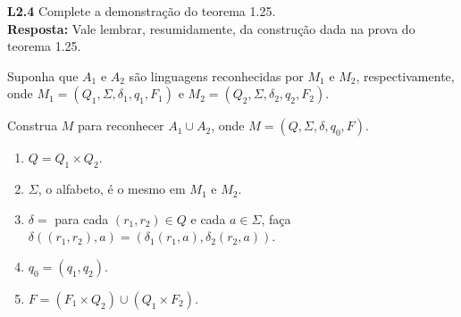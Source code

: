 
\noindent \textbf{L2.4} Complete a demonstração do teorema 1.25.\\[3pt]
\textbf{Resposta:} Vale lembrar, resumidamente, da construção dada na prova do teorema 1.25.

Suponha que $A_1$ e $A_2$ são linguagens reconhecidas por $M_1$ e $M_2$, respectivamente, onde $M_1 = (Q_1, \Sigma, \delta_1, q_1, F_1)$ e $M_2 = (Q_2, \Sigma, \delta_2, q_2, F_2)$.

Construa $M$ para reconhecer $A_1 \cup A_2$, onde $M = (Q, \Sigma, \delta, q_0, F)$.
\begin{enumerate}[label=\textbf{\arabic*}]
    \item $Q = Q_1 \times Q_2$.
    \item $\Sigma$, o alfabeto, é o mesmo em $M_1$ e $M_2$.
    \item $\delta = $ para cada $(r_1, r_2) \in Q$ e cada $a \in \Sigma$, faça $\delta((r_1, r_2), a) = (\delta_1(r_1, a), \delta_2(r_2, a))$.
    \item $q_0 = (q_1, q_2)$.
    \item $F = (F_1 \times Q_2) \cup (Q_1 \times F_2)$.
\end{enumerate}

